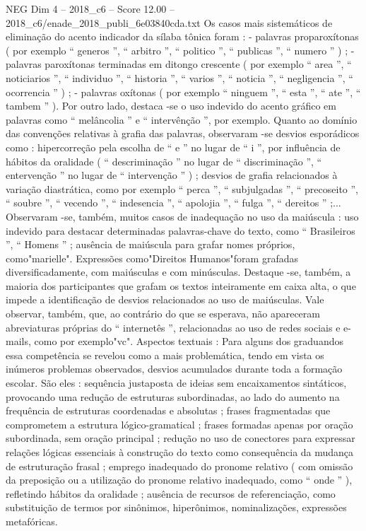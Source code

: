 \begin{textsample}{NEG Dim 4 – 2018\_c6 – Score 12.00 – 2018\_c6/enade\_2018\_publi\_6e03840cda.txt}
Os casos mais sistemáticos de eliminação do acento indicador da sílaba tônica foram : - palavras proparoxítonas ( por exemplo “ generos ”, “ arbitro ”, “ politico ”, “ publicas ”, “ numero ” ) ; - palavras paroxítonas terminadas em ditongo crescente ( por exemplo “ area ”, “ noticiarios ”, “ individuo ”, “ historia ”, “ varios ”, “ noticia ”, “ negligencia ”, “ ocorrencia ” ) ; - palavras oxítonas ( por exemplo “ ninguem ”, “ esta ”, “ ate ”, “ tambem ” ).
Por outro lado, destaca -se o uso indevido do acento gráfico em palavras como “ melâncolia ” e “ intervênção ”, por exemplo.
Quanto ao domínio das convenções relativas à grafia das palavras, observaram -se desvios esporádicos como : hipercorreção pela escolha de “ e ” no lugar de “ i ”, por influência de hábitos da oralidade ( “ descriminação ” no lugar de “ discriminação ”, “ entervenção ” no lugar de “ intervenção ” ) ; desvios de grafia relacionados à variação diastrática, como por exemplo “ perca ”, “ subjulgadas ”, “ precoseito ”, “ soubre ”, “ vecendo ”, “ indesencia ”, “ apolojia ”, “ fulga ”, “ dereitos ” ;...
Observaram -se, também, muitos casos de inadequação no uso da maiúscula : uso indevido para destacar determinadas palavras-chave do texto, como “ Brasileiros ”, “ Homens ” ; ausência de maiúscula para grafar nomes próprios, como"marielle".
Expressões como"Direitos Humanos"foram grafadas diversificadamente, com maiúsculas e com minúsculas.
Destaque -se, também, a maioria dos participantes que grafam os textos inteiramente em caixa alta, o que impede a identificação de desvios relacionados ao uso de maiúsculas.
Vale observar, também, que, ao contrário do que se esperava, não apareceram abreviaturas próprias do “ internetês ”, relacionadas ao uso de redes sociais e e-mails, como por exemplo"vc".
Aspectos textuais : Para alguns dos graduandos essa competência se revelou como a mais problemática, tendo em vista os inúmeros problemas observados, desvios acumulados durante toda a formação escolar.
São eles : sequência justaposta de ideias sem encaixamentos sintáticos, provocando uma redução de estruturas subordinadas, ao lado do aumento na frequência de estruturas coordenadas e absolutas ; frases fragmentadas que comprometem a estrutura lógico-gramatical ; frases formadas apenas por oração subordinada, sem oração principal ; redução no uso de conectores para expressar relações lógicas essenciais à construção do texto como consequência da mudança de estruturação frasal ; emprego inadequado do pronome relativo ( com omissão da preposição ou a utilização do pronome relativo inadequado, como “ onde ” ), refletindo hábitos da oralidade ; ausência de recursos de referenciação, como substituição de termos por sinônimos, hiperônimos, nominalizações, expressões metafóricas.

\end{textsample}
